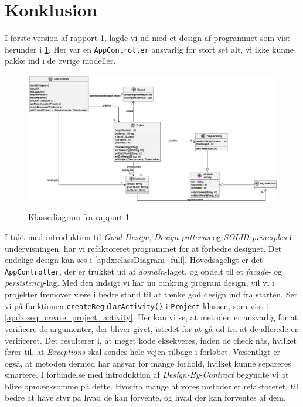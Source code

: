 \section{Konklusion} \label{chap:conclusion}
I første version af rapport 1, lagde vi ud med et design af programmet som vist herunder i \cref{fig:class_report1}. Her var en \texttt{AppController} ansvarlig for stort set alt, vi ikke kunne pakke ind i de øvrige modeller.
\begin{figure}[H]
    \centering
    \caption{Klassediagram fra rapport 1}
    \includegraphics[width = \textwidth]{RequirementsAndDesign/Diagrams/ClassDiagram.eps}
    \label{fig:class_report1}
\end{figure}
I takt med introduktion til \textit{Good Design}, \textit{Design patterns} og \textit{SOLID-principles} i undervisningen, har vi refaktoreret programmet for at forbedre designet. Det endelige design kan ses i \cref{apdx:classDiagram_full}. Hovedsageligt er det \texttt{AppController}, der er trukket ud af \textit{domain}-laget, og opdelt til et \textit{facade}- og \textit{persistency}-lag. Med den indsigt vi har nu omkring program design, vil vi i projekter fremover være i bedre stand til at tænke god design ind fra starten.
Ser vi på funktionen \texttt{createRegularActivity()} i \texttt{Project} klassen, som vist i \cref{apdx:seq_create_project_activity}. Her kan vi se, at metoden er ansvarlig for at verificere de argumenter, der bliver givet, istedet for at gå ud fra at de allerede er verificeret. Det resulterer i, at meget kode eksekveres, inden de check nås, hvilket fører til, at \textit{Exceptions} skal sendes hele vejen tilbage i forløbet. Væsentligt er også, at metoden dermed har ansvar for mange forhold, hvilket kunne separeres smartere. I forbindelse med introduktion af \textit{Design-By-Contract} begyndte vi at blive opmærksomme på dette. Hvorfra mange af vores metoder er refaktoreret, til bedre at have styr på hvad de kan forvente, og hvad der kan forventes af dem.\newline
